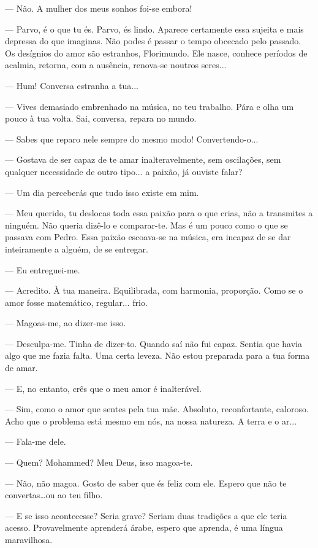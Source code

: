 --- Não. A mulher dos meus sonhos foi-se embora!

--- Parvo, é o que tu és. Parvo, és lindo. Aparece certamente essa sujeita
e mais depressa do que imaginas. Não podes é passar o tempo obcecado
pelo passado. Os desígnios do amor são estranhos, Florimundo. Ele nasce,
conhece períodos de acalmia, retorna, com a ausência, renova-se noutros
seres...

--- Hum! Conversa estranha a tua...

--- Vives demasiado embrenhado na música, no teu trabalho. Pára e olha um
pouco à tua volta. Sai, conversa, repara no mundo.

--- Sabes que reparo nele sempre do mesmo modo! Convertendo-o...

--- Gostava de ser capaz de te amar inalteravelmente, sem oscilações, sem
qualquer necessidade de outro tipo... a paixão, já ouviste falar?

--- Um dia perceberás que tudo isso existe em mim.

--- Meu querido, tu deslocas toda essa paixão para o que crias, não a
transmites a ninguém. Não queria dizê-lo e comparar-te. Mas é um pouco
como o que se passava com Pedro. Essa paixão escoava-se na música, era
incapaz de se dar inteiramente a alguém, de se entregar.

--- Eu entreguei-me.

--- Acredito. À tua maneira. Equilibrada, com harmonia, proporção. Como se
o amor fosse matemático, regular... frio.

--- Magoas-me, ao dizer-me isso.

--- Desculpa-me. Tinha de dizer-to. Quando saí não fui capaz. Sentia que
havia algo que me fazia falta. Uma certa leveza. Não estou preparada
para a tua forma de amar.

--- E, no entanto, crês que o meu amor é inalterável.

--- Sim, como o amor que sentes pela tua mãe. Absoluto, reconfortante,
caloroso. Acho que o problema está mesmo em nós, na nossa natureza. A
terra e o ar...

--- Fala-me dele.

--- Quem? Mohammed? Meu Deus, isso magoa-te.

--- Não, não magoa. Gosto de saber que és feliz com ele. Espero que não te
convertas\ldots{}ou ao teu filho.

--- E se isso acontecesse? Seria grave? Seriam duas tradições a que ele
teria acesso. Provavelmente aprenderá árabe, espero que aprenda, é uma
língua maravilhosa.

